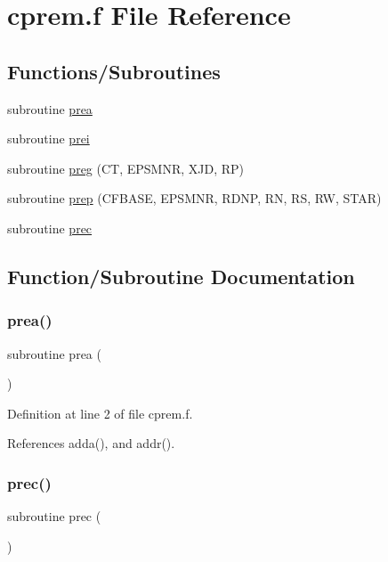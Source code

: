 \hypertarget{cprem_8f}{}\section{cprem.\+f File Reference}
\label{cprem_8f}
\subsection*{Functions/\+Subroutines}
\begin{DoxyCompactItemize}
\item 
subroutine \hyperlink{cprem_8f_abbaca1008d54fe781d8b205af8f469cd}{prea}
\item 
subroutine \hyperlink{cprem_8f_a3e18e670c3f7745523dc759fa5957b4b}{prei}
\item 
subroutine \hyperlink{cprem_8f_a532eba7295b2fd29ded9aabb90b5a646}{preg} (CT, E\+P\+S\+M\+NR, X\+JD, RP)
\item 
subroutine \hyperlink{cprem_8f_a6d118ab3a0eb30a4e5ea2e73ed5c6ccc}{prep} (C\+F\+B\+A\+SE, E\+P\+S\+M\+NR, R\+D\+NP, RN, RS, RW, S\+T\+AR)
\item 
subroutine \hyperlink{cprem_8f_a2f3fb37220917811606624e678d211bb}{prec}
\end{DoxyCompactItemize}


\subsection{Function/\+Subroutine Documentation}
\mbox{\label{cprem_8f_abbaca1008d54fe781d8b205af8f469cd}} 
\subsubsection{\texorpdfstring{prea()}{prea()}}
{\footnotesize\ttfamily subroutine prea (\begin{DoxyParamCaption}{ }\end{DoxyParamCaption})}



Definition at line 2 of file cprem.\+f.



References adda(), and addr().

\mbox{\label{cprem_8f_a2f3fb37220917811606624e678d211bb}} 
\subsubsection{\texorpdfstring{prec()}{prec()}}
{\footnotesize\ttfamily subroutine prec (\begin{DoxyParamCaption}{ }\end{DoxyParamCaption})}



